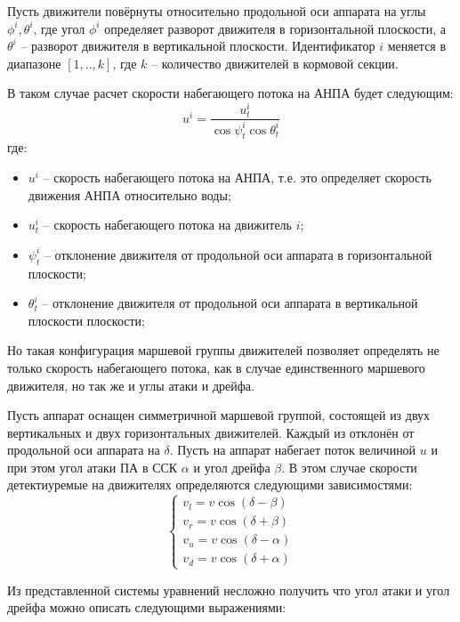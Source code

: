 Пусть движители повёрнуты относительно продольной оси аппарата на углы $\phi^i, \theta^i$, где угол $\phi^i$ определяет разворот движителя в горизонтальной плоскости, а $\theta^i$ -- разворот движителя в вертикальной плоскости.
Идентификатор $i$ меняется в диапазоне $[1,..,k]$, где $k$ -- количество движителей в кормовой секции.

В таком случае расчет скорости набегающего потока на АНПА будет следующим:
\begin{equation}
    \label{eq:velocity_orientation}
    u^i = \frac{u^i_t}{\cos{\psi^i_t}\cos{\theta^i_t}}
\end{equation}
\noindent где:
\begin{itemize}
    \item $u^i$ -- скорость набегающего потока на АНПА, т.е. это определяет скорость движения АНПА относительно воды;
    \item $u^i_t$ -- скорость набегающего потока на движитель $i$;
    \item $\psi^i_t$ -- отклонение движителя от продольной оси аппарата в горизонтальной плоскости;
    \item $\theta^i_t$ -- отклонение движителя от продольной оси аппарата в вертикальной плоскости плоскости;
\end{itemize}

Но такая конфигурация маршевой группы движителей позволяет определять не только скорость набегающего потока, как в случае единственного маршевого движителя, но так же и углы атаки и дрейфа.

Пусть аппарат оснащен симметричной маршевой группой, состоящей из двух вертикальных и двух горизонтальных движителей.
Каждый из отклонён от продольной оси аппарата на $\delta$. 
Пусть на аппарат набегает поток величиной $u$ и при этом угол атаки ПА в ССК $\alpha$ и угол дрейфа $\beta$.
В этом случае скорости детектиуремые на движителях определяются следующими зависимостями:
\begin{equation*}
    \left\{
    \begin{array}{l}
        v_l = v \cos{(\delta - \beta)} \\
        v_r = v \cos{(\delta + \beta)} \\
        v_u = v \cos{(\delta - \alpha)} \\
        v_d = v \cos{(\delta + \alpha)}
    \end{array}
    \right.
\end{equation*}

Из представленной системы уравнений несложно получить что угол атаки и угол дрейфа можно описать следующими выражениями:

